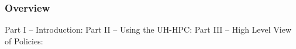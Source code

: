 \documentclass[t,hyperref={pdfpagelabels=false},9pt]{beamer}
\begin{document}
\begin{frame}
\titlepage %
\end{frame}


\begin{frame}
\frametitle{Overview} %
Part I -- Introduction:
\tableofcontents[part=1,hideallsubsections]
Part II -- Using the UH-HPC:
\tableofcontents[part=2,hideallsubsections]
Part III -- High Level View of Policies:
\tableofcontents[part=3,hideallsubsections]

\tableofcontents[] %
\end{frame}






%
%
%
%

%
%
\end{document}
